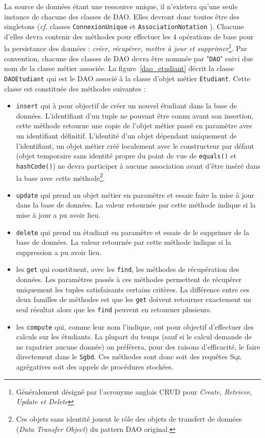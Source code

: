 \documentclass[a4paper,11pt]{article}
\begin{document}
La source de données étant une ressource unique, il n'existera qu'une seule instance de chacune 
des classes de DAO. Elles devront donc toutes être des singletons (\emph{cf.} classes 
\texttt{ConnexionUnique} et \texttt{AssociationNotation} ). Chacune d'elles devra contenir 
des méthodes pour effectuer les 4 opérations de base pour la persistance des données : 
\textit{créer, récupérer, mettre à jour et supprimer}\footnote{Généralement désigné par l'acronyme anglais CRUD pour 
\textit{Create, Retrieve, Update et Delete}}. Par convention, chacune des classes de DAO devra être 
nommée par "\texttt{DAO}" suivi due nom de la classe métier associée. La figure~\ref{dao_etudiant} 
décrit la classe \texttt{DAOEtudiant} qui est le DAO associé à la classe d'objet métier \texttt{Etudiant}.
Cette classe est constituée des méthodes suivantes :
\begin{itemize}
	\item \texttt{insert} qui à pour objectif de créer un nouvel étudiant dans la base de données.
	L'identifiant d'un tuple ne pouvant être connu avant son insertion, cette méthode retourne 
	une copie de l'objet métier passé en paramètre avec un identifiant définitif. L'identité d'un 
	objet dépendant uniquement de l'identifiant, un objet métier créé localement avec le 
	constructeur par défaut (objet temporaire sans identité propre du point de vue de 
	\texttt{equals()} et \texttt{hashCode()}) ne devra participer à aucune association 
	avant d'être inséré dans la base avec cette méthode\footnote{Ces objets sans identité jouent le rôle des objets 
	de transfert de données (\textit{Data Transfer Object}) du pattern DAO original.}.

	\item \texttt{update} qui prend un objet métier en paramètre et essaie faire la mise à jour 
	dans la base de données. La valeur retournée par cette méthode indique si la mise à jour 
	a pu avoir lieu.
	
  \item \texttt{delete} qui prend un étudiant en paramètre et essaie de le supprimer de la base 
  de données. La valeur retournée par cette méthode indique si la suppression a pu avoir lieu.
  
  \item les \texttt{get} qui constituent, avec les \texttt{find}, les méthodes 
  de récupération des données. Les paramètres passés à ces méthodes permettent de récupérer
  uniquement les tuples satisfaisants certains critères. La différence entre ces deux 
  familles de méthodes est que les \texttt{get} doivent retourner exactement un seul 
  résultat alors que les \texttt{find} peuvent en retourner plusieurs.
  
  \item les \texttt{compute} qui, comme leur nom l'indique, ont pour objectif d'effectuer des 
  calculs sur les étudiants. La plupart du temps (sauf si le calcul demande de ne rapatrier 
  aucune donnée) on préférera, pour des raisons d'efficacité, le faire directement dans le \texttt{Sgbd}. 
  Ces méthodes sont donc soit des requêtes \textsc{Sql} agrégatives soit des appels de procédures stockées.	
\end{itemize}
\end{document}
